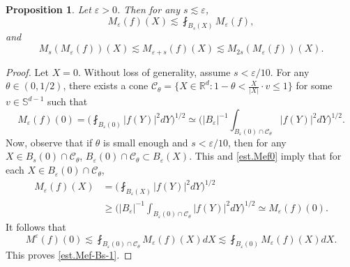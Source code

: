 \documentclass[reqno,12pt]{amsart} %
\newtheorem{proposition}[theorem]{Proposition}
\theoremstyle{definition}
\theoremstyle{remark}
\numberwithin{equation}{section}
\newcommand{\R}{\mathbb{R}}
\newcommand{\e}{\varepsilon}
\begin{document}
\begin{proposition}\label{prop.Mef-Bs}
    Let $\e > 0$. Then for any $s \lesssim \e$,
    \begin{equation}\label{est.Mef-Bs-1}
        M_\e(f)(X) \lesssim \fint_{B_s(X)} M_\e(f),
    \end{equation}
    and
    \begin{equation}\label{est.Mef-Bs-2}
        M_s(M_\e(f))(X) \lesssim M_{\e+s}(f)(X) \lesssim M_{2s}(M_\e(f))(X).
    \end{equation}
\end{proposition}
\begin{proof}
    Let $X = 0$. Without loss of generality, assume $s < \e/10$. For any $\theta \in (0,1/2)$, there exists a cone $\mathcal{C}_\theta = \{ X \in \R^d: 1-\theta < \frac{X}{|X|}\cdot v \le 1 \} $ for some $v \in \mathbb{S}^{d-1}$ such that
    \begin{equation}\label{est.Mef0}
        M_\e(f)(0) = \bigg( \fint_{B_\e(0)} |f(Y)|^2 dY \bigg)^{1/2} \simeq \bigg( |B_\e|^{-1}\int_{B_\e(0) \cap \mathcal{C}_\theta} |f(Y)|^2 dY \bigg)^{1/2}.
    \end{equation}
    Now, observe that if $\theta$ is small enough and $s<\e/10$, then for any $X \in B_s(0) \cap \mathcal{C}_\theta$, $B_\e(0) \cap \mathcal{C}_\theta \subset B_\e(X)$. This and \eqref{est.Mef0} imply that for each $X \in B_\e(0) \cap \mathcal{C}_\theta$,
    \begin{equation}
    \begin{aligned}
        M_\e(f)(X) & = \bigg( \fint_{B_\e(X)} |f(Y)|^2 dY \bigg)^{1/2} \\
        & \ge \bigg( |B_\e|^{-1} \int_{B_\e(0) \cap \mathcal{C}_\theta} |f(Y)|^2 dY \bigg)^{1/2} \simeq M_\e(f)(0).
    \end{aligned}
    \end{equation}
    It follows that
    \begin{equation}
        M^\e(f)(0) \lesssim \fint_{B_\e(0) \cap \mathcal{C}_\theta} M_\e(f)(X) dX \lesssim \fint_{B_\e(0) } M_\e(f)(X) dX.
    \end{equation}
    This proves \eqref{est.Mef-Bs-1}.


\end{proof}
\end{document}
